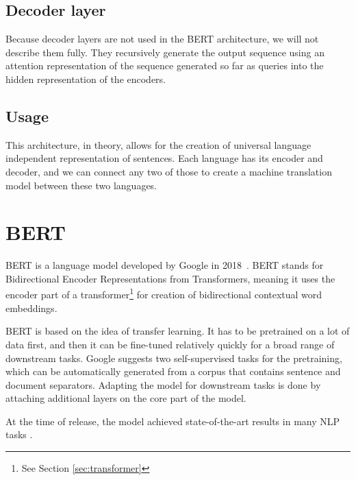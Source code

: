 \documentclass[
  printed, %
  color,   %
  table,   %
  oneside, %
  lof,     %
  lot,     %
]{fithesis3}
\begin{document}
\subsection{Decoder layer}
Because decoder layers are not used in the BERT architecture, we will not describe them fully. They recursively generate the output sequence using an attention representation of the sequence generated so far as queries into the hidden representation of the encoders.

\subsection{Usage}
This architecture, in theory, allows for the creation of universal language independent representation of sentences. Each language has its encoder and decoder, and we can connect any two of those to create a machine translation model between these two languages. 



\section{BERT}
BERT is a language model developed by Google in 2018~\parencite{bert}. BERT stands for Bidirectional Encoder Representations from Transformers, meaning it uses the encoder part of a transformer\footnote{See Section \ref{sec:transformer}} for creation of bidirectional contextual word embeddings. 

BERT is based on the idea of transfer learning. It has to be pretrained on a lot of data first, and then it can be fine-tuned relatively quickly for a broad range of downstream tasks. Google suggests two self-supervised tasks for the pretraining, which can be automatically generated from a corpus that contains sentence and document separators. Adapting the model for downstream tasks is done by attaching additional layers on the core part of the model.  

At the time of release, the model achieved state-of-the-art results in many NLP tasks \parencite{bert}. 
\end{document}
